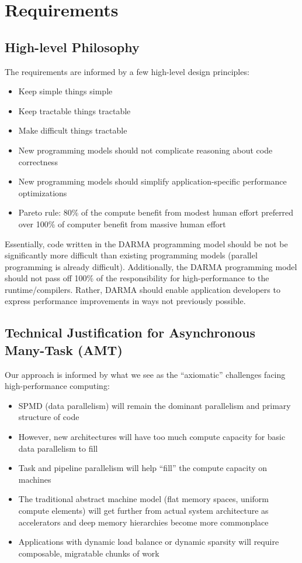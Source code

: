 
\chapter{Requirements} 
\label{chap:requirements} 
\section{High-level Philosophy}
The requirements are informed by a few high-level design principles:
\begin{itemize}
\item Keep simple things simple
\item Keep tractable things tractable
\item Make difficult things tractable
\item New programming models should not complicate reasoning about code correctness
\item New programming models should simplify application-specific performance optimizations
\item Pareto rule: 80\% of the compute benefit from modest human effort preferred over 100\% of computer benefit from massive human effort
\end{itemize}
Essentially, code written in the DARMA programming model should be not be significantly more difficult than existing programming models (parallel programming is already difficult).
Additionally, the DARMA programming model should not pass off 100\% of the responsibility for high-performance to the runtime/compilers.
Rather, DARMA should enable application developers to express performance improvements in ways not previously possible.

\section{Technical Justification for Asynchronous Many-Task (AMT)}
Our approach is informed by what we see as the ``axiomatic'' challenges facing high-performance computing:
\begin{itemize}
\item SPMD (data parallelism) will remain the dominant parallelism and primary structure of code
\item However, new architectures will have too much compute capacity for basic data parallelism to fill
\item Task and pipeline parallelism will help ``fill'' the compute capacity on machines
\item The traditional abstract machine model (flat memory spaces, uniform compute elements) will get further from actual system architecture as accelerators and deep memory hierarchies become more commonplace
\item Applications with dynamic load balance or dynamic sparsity will require composable, migratable chunks of work
\end{itemize}

